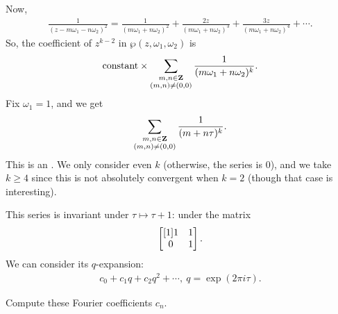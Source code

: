 \documentclass[11pt, oneside,margin=1in]{article}
\begin{document}
\begin{example}
Now,
\begin{align*}
	\frac{1}{(z-m\omega_1-n\omega_2)^2} = \frac{1}{(m\omega_1+n\omega_2)^2} + \frac{2z}{(m\omega_1+n\omega_2)^3} + \frac{3z}{(m\omega_1+n\omega_2)^4} + \cdots.
\end{align*}
So, the coefficient of $z^{k-2}$ in $\wp(z,\omega_1,\omega_2)$ is
\begin{align*}
	\textrm{constant} \times \sum_{\substack{m,n\in \mathbf Z\\(m,n)\ne (0,0)}}^{} \frac{1}{(m\omega_1+n\omega_2) ^k}.
\end{align*}
Fix $\omega_1=1$, and we get
\begin{align*}
	\sum_{\substack{m,n\in \mathbf Z\\(m,n)\ne (0,0)}}^{} \frac{1}{(m+n\tau)^k}.
\end{align*}
This is an . We only consider even $k$ (otherwise, the series is $0$), and we take $k\ge 4$ since this is not absolutely convergent when $k=2$ (though that case is interesting).

This series is invariant under $\tau \longmapsto \tau+1$: under the matrix
 \begin{align*}
	 \begin{bmatrix} [1] 1&1\\0&1\end{bmatrix}.
\end{align*}
We can consider its $q$-expansion:
\begin{align*}
	c_0 + c_1q + c_2q^2 + \cdots,\ q=\exp(2\pi i\tau).
\end{align*}
\begin{problem}
	Compute these Fourier coefficients $c_n$.
\end{problem}
\end{example}
\end{document}
